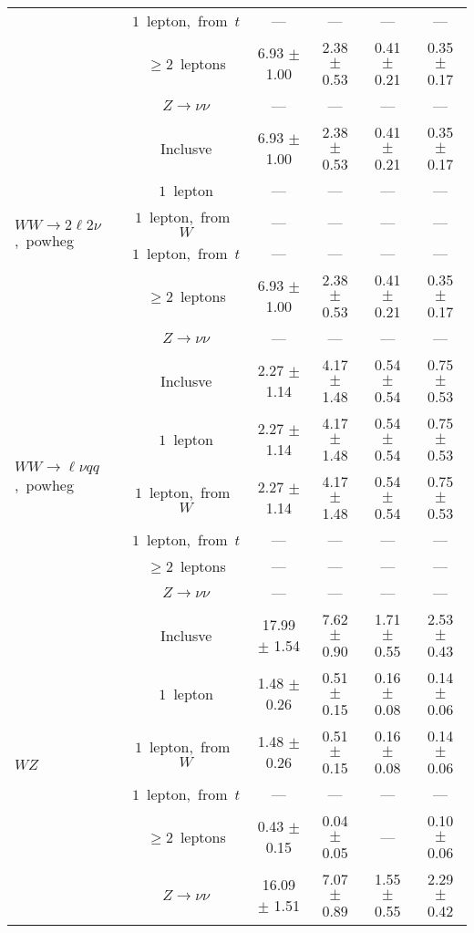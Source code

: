 \documentclass{article}
\begin{document}
\begin{longtable}{|l|c|c|c|c|c|}
 & $1$~lepton,~from~$t$  & ---  & ---  & ---  & --- \\* 
 & $\ge2$~leptons  & 6.93 $\pm$ 1.00  & 2.38 $\pm$ 0.53  & 0.41 $\pm$ 0.21  & 0.35 $\pm$ 0.17 \\* 
 & $Z\rightarrow\nu\nu$  & ---  & ---  & ---  & --- \\* 
\hline 
\multirow{6}{*}{$WW{\rightarrow}2\ell2\nu$,~powheg} & Inclusve  & 6.93 $\pm$ 1.00  & 2.38 $\pm$ 0.53  & 0.41 $\pm$ 0.21  & 0.35 $\pm$ 0.17 \\* 
 & $1$~lepton  & ---  & ---  & ---  & --- \\* 
 & $1$~lepton,~from~$W$  & ---  & ---  & ---  & --- \\* 
 & $1$~lepton,~from~$t$  & ---  & ---  & ---  & --- \\* 
 & $\ge2$~leptons  & 6.93 $\pm$ 1.00  & 2.38 $\pm$ 0.53  & 0.41 $\pm$ 0.21  & 0.35 $\pm$ 0.17 \\* 
 & $Z\rightarrow\nu\nu$  & ---  & ---  & ---  & --- \\* 
\hline 
\multirow{6}{*}{$WW{\rightarrow}{\ell}{\nu}qq$,~powheg} & Inclusve  & 2.27 $\pm$ 1.14  & 4.17 $\pm$ 1.48  & 0.54 $\pm$ 0.54  & 0.75 $\pm$ 0.53 \\* 
 & $1$~lepton  & 2.27 $\pm$ 1.14  & 4.17 $\pm$ 1.48  & 0.54 $\pm$ 0.54  & 0.75 $\pm$ 0.53 \\* 
 & $1$~lepton,~from~$W$  & 2.27 $\pm$ 1.14  & 4.17 $\pm$ 1.48  & 0.54 $\pm$ 0.54  & 0.75 $\pm$ 0.53 \\* 
 & $1$~lepton,~from~$t$  & ---  & ---  & ---  & --- \\* 
 & $\ge2$~leptons  & ---  & ---  & ---  & --- \\* 
 & $Z\rightarrow\nu\nu$  & ---  & ---  & ---  & --- \\* 
\hline 
\multirow{6}{*}{$WZ$} & Inclusve  & 17.99 $\pm$ 1.54  & 7.62 $\pm$ 0.90  & 1.71 $\pm$ 0.55  & 2.53 $\pm$ 0.43 \\* 
 & $1$~lepton  & 1.48 $\pm$ 0.26  & 0.51 $\pm$ 0.15  & 0.16 $\pm$ 0.08  & 0.14 $\pm$ 0.06 \\* 
 & $1$~lepton,~from~$W$  & 1.48 $\pm$ 0.26  & 0.51 $\pm$ 0.15  & 0.16 $\pm$ 0.08  & 0.14 $\pm$ 0.06 \\* 
 & $1$~lepton,~from~$t$  & ---  & ---  & ---  & --- \\* 
 & $\ge2$~leptons  & 0.43 $\pm$ 0.15  & 0.04 $\pm$ 0.05  & ---  & 0.10 $\pm$ 0.06 \\* 
 & $Z\rightarrow\nu\nu$  & 16.09 $\pm$ 1.51  & 7.07 $\pm$ 0.89  & 1.55 $\pm$ 0.55  & 2.29 $\pm$ 0.42 \\* 

\end{longtable}
\end{document}

